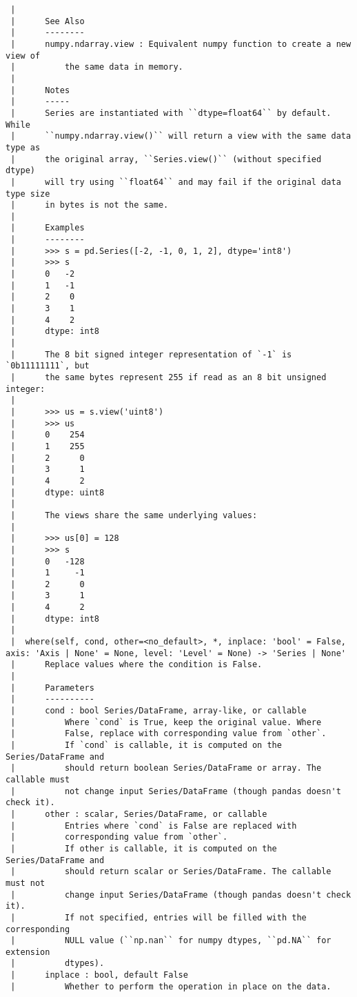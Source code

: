 \documentclass[
  letterpaper,
  DIV=11,
  numbers=noendperiod]{scrreprt}
\begin{document}
\begin{verbatim}
 |      
 |      See Also
 |      --------
 |      numpy.ndarray.view : Equivalent numpy function to create a new view of
 |          the same data in memory.
 |      
 |      Notes
 |      -----
 |      Series are instantiated with ``dtype=float64`` by default. While
 |      ``numpy.ndarray.view()`` will return a view with the same data type as
 |      the original array, ``Series.view()`` (without specified dtype)
 |      will try using ``float64`` and may fail if the original data type size
 |      in bytes is not the same.
 |      
 |      Examples
 |      --------
 |      >>> s = pd.Series([-2, -1, 0, 1, 2], dtype='int8')
 |      >>> s
 |      0   -2
 |      1   -1
 |      2    0
 |      3    1
 |      4    2
 |      dtype: int8
 |      
 |      The 8 bit signed integer representation of `-1` is `0b11111111`, but
 |      the same bytes represent 255 if read as an 8 bit unsigned integer:
 |      
 |      >>> us = s.view('uint8')
 |      >>> us
 |      0    254
 |      1    255
 |      2      0
 |      3      1
 |      4      2
 |      dtype: uint8
 |      
 |      The views share the same underlying values:
 |      
 |      >>> us[0] = 128
 |      >>> s
 |      0   -128
 |      1     -1
 |      2      0
 |      3      1
 |      4      2
 |      dtype: int8
 |  
 |  where(self, cond, other=<no_default>, *, inplace: 'bool' = False, axis: 'Axis | None' = None, level: 'Level' = None) -> 'Series | None'
 |      Replace values where the condition is False.
 |      
 |      Parameters
 |      ----------
 |      cond : bool Series/DataFrame, array-like, or callable
 |          Where `cond` is True, keep the original value. Where
 |          False, replace with corresponding value from `other`.
 |          If `cond` is callable, it is computed on the Series/DataFrame and
 |          should return boolean Series/DataFrame or array. The callable must
 |          not change input Series/DataFrame (though pandas doesn't check it).
 |      other : scalar, Series/DataFrame, or callable
 |          Entries where `cond` is False are replaced with
 |          corresponding value from `other`.
 |          If other is callable, it is computed on the Series/DataFrame and
 |          should return scalar or Series/DataFrame. The callable must not
 |          change input Series/DataFrame (though pandas doesn't check it).
 |          If not specified, entries will be filled with the corresponding
 |          NULL value (``np.nan`` for numpy dtypes, ``pd.NA`` for extension
 |          dtypes).
 |      inplace : bool, default False
 |          Whether to perform the operation in place on the data.

\end{verbatim}
\end{document}
